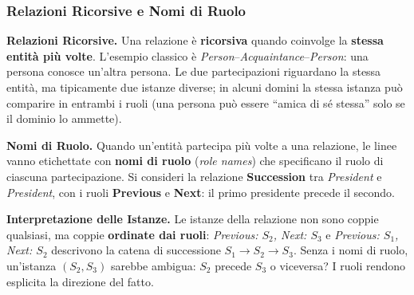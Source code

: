 \documentclass[12pt]{extarticle}
\begin{document}
\subsubsection{Relazioni Ricorsive e Nomi di Ruolo}

\noindent \textbf{Relazioni Ricorsive.} Una relazione è \textbf{ricorsiva} quando coinvolge la \textbf{stessa entità più volte}. L'esempio classico è \textit{Person}--\textit{Acquaintance}--\textit{Person}: una persona conosce un'altra persona. Le due partecipazioni riguardano la stessa entità, ma tipicamente due istanze diverse; in alcuni domini la stessa istanza può comparire in entrambi i ruoli (una persona può essere ``amica di sé stessa'' solo se il dominio lo ammette).

\medskip
\noindent \textbf{Nomi di Ruolo.} Quando un'entità partecipa più volte a una relazione, le linee vanno etichettate con \textbf{nomi di ruolo} (\textit{role names}) che specificano il ruolo di ciascuna partecipazione. Si consideri la relazione \textbf{Succession} tra \textit{President} e \textit{President}, con i ruoli \textbf{Previous} e \textbf{Next}: il primo presidente precede il secondo.

\begin{center}
\end{center}

\medskip
\noindent \textbf{Interpretazione delle Istanze.} Le istanze della relazione non sono coppie qualsiasi, ma coppie \textbf{ordinate dai ruoli}: \textit{Previous: $S_2$, Next: $S_3$} e \textit{Previous: $S_1$, Next: $S_2$} descrivono la catena di successione $S_1 \to S_2 \to S_3$. Senza i nomi di ruolo, un'istanza $(S_2, S_3)$ sarebbe ambigua: $S_2$ precede $S_3$ o viceversa? I ruoli rendono esplicita la direzione del fatto.
\end{document}
